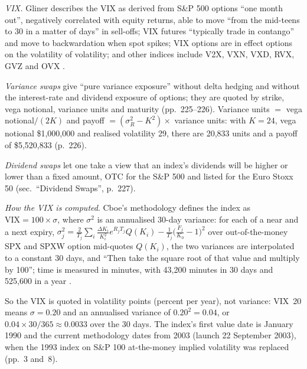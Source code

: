 \begin{qfdefinition}\label{def:vix-variance-dividend-swaps}
 \emph{VIX.} Gliner describes the VIX as derived from S\&P 500 options ``one month out'', negatively correlated with equity returns, able to move ``from the mid-teens to 30 in a matter of days'' in sell-offs; VIX futures ``typically trade in contango'' and move to backwardation when spot spikes; VIX options are in effect options on the volatility of volatility; and other indices include V2X, VXN, VXD, RVX, GVZ and OVX \citep[chap.~8, sec.\ ``The Volatility Index (VIX)'', PDF pp.~222--225]{s7-gliner}.

\emph{Variance swaps} give ``pure variance exposure'' without delta hedging and without the interest-rate and dividend exposure of options; they are quoted by strike, vega notional, variance units and maturity (pp.~225--226). Variance units $=$ vega notional$/(2K)$ and payoff $=(\sigma_R^2-K^2)\times$ variance units: with $K=24$, vega notional \$1,000,000 and realised volatility 29, there are 20,833 units and a payoff of \$5,520,833 (p.~226).

\emph{Dividend swaps} let one take a view that an index's dividends will be higher or lower than a fixed amount, OTC for the S\&P 500 and listed for the Euro Stoxx 50 (sec.\ ``Dividend Swaps'', p.~227).

\emph{How the VIX is computed}. Cboe's methodology defines the index as $\text{VIX}=100\times\sigma$, where $\sigma^2$ is an annualised 30-day variance: for each of a near and a next expiry, $\sigma_j^2=\frac{2}{T_j}\sum_i\frac{\Delta K_i}{K_i^2}e^{R_jT_j}Q(K_i)-\frac{1}{T_j}\bigl(\frac{F_j}{K_0}-1\bigr)^2$ over out-of-the-money SPX and SPXW option mid-quotes $Q(K_i)$, the two variances are interpolated to a constant 30 days, and ``Then take the square root of that value and multiply by 100''; time is measured in minutes, with 43,200 minutes in 30 days and 525,600 in a year \citep[sec.~3.1, pp.~4--6, and app.~3, pp.~9--14]{gap-cboe-vix6}.

So the VIX is quoted in volatility points (percent per year), not variance: VIX~20 means $\sigma=0.20$ and an annualised variance of $0.20^2=0.04$, or $0.04\times30/365\approx0.0033$ over the 30 days. The index's first value date is January 1990 and the current methodology dates from 2003 (launch 22 September 2003), when the 1993 index on S\&P 100 at-the-money implied volatility was replaced (pp.~3 and~8).


\end{qfdefinition}
